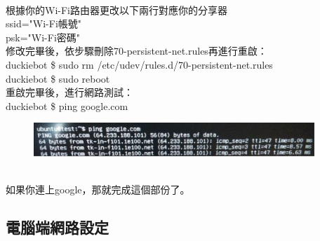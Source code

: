 \documentclass{article}
\begin{document}
\\根據你的Wi-Fi路由器更改以下兩行對應你的分享器
\\ssid="Wi-Fi帳號"
\\psk="Wi-Fi密碼"
\\修改完畢後，依步驟刪除70-persistent-net.rules再進行重啟：
\\duckiebot \$ sudo rm /etc/udev/rules.d/70-persistent-net.rules
\\duckiebot \$ sudo reboot
\\重啟完畢後，進行網路測試：
\\duckiebot \$ ping google.com
\begin{figure}[htp]
    \begin{center}
        \includegraphics[width=300pt]{pic/圖片12.jpg}
    \end{center}
\end{figure}
\\如果你連上google，那就完成這個部份了。

\subsection{電腦端網路設定}
\end{document}
